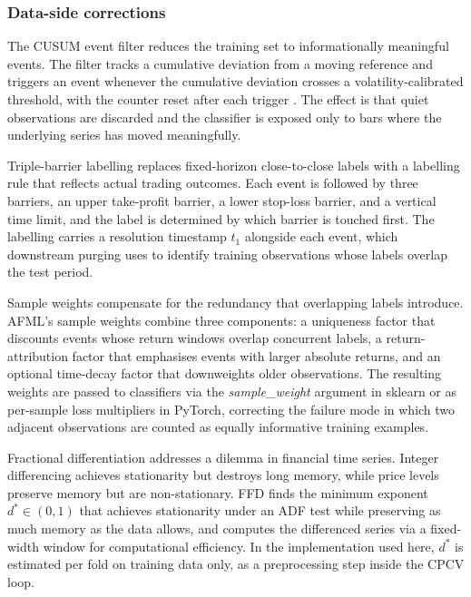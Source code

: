 \documentclass[12pt,a4paper,oneside]{article}
\begin{document}
\subsubsection{Data-side corrections}\label{subsubsec:afml_data_side}

The CUSUM event filter reduces the training set to informationally meaningful events. The filter tracks a cumulative deviation from a moving reference and triggers an event whenever the cumulative deviation crosses a volatility-calibrated threshold, with the counter reset after each trigger \citep[Snippet 2.4]{lopez_de_prado_2018}. The effect is that quiet observations are discarded and the classifier is exposed only to bars where the underlying series has moved meaningfully.

Triple-barrier labelling replaces fixed-horizon close-to-close labels with a labelling rule that reflects actual trading outcomes. Each event is followed by three barriers, an upper take-profit barrier, a lower stop-loss barrier, and a vertical time limit, and the label is determined by which barrier is touched first. The labelling carries a resolution timestamp $t_1$ alongside each event, which downstream purging uses to identify training observations whose labels overlap the test period.

Sample weights compensate for the redundancy that overlapping labels introduce. AFML's sample weights combine three components: a uniqueness factor that discounts events whose return windows overlap concurrent labels, a return-attribution factor that emphasises events with larger absolute returns, and an optional time-decay factor that downweights older observations. The resulting weights are passed to classifiers via the \textit{sample\_weight} argument in sklearn or as per-sample loss multipliers in PyTorch, correcting the failure mode in which two adjacent observations are counted as equally informative training examples.

Fractional differentiation addresses a dilemma in financial time series. Integer differencing achieves stationarity but destroys long memory, while price levels preserve memory but are non-stationary. FFD finds the minimum exponent $d^* \in (0, 1)$ that achieves stationarity under an ADF test while preserving as much memory as the data allows, and computes the differenced series via a fixed-width window for computational efficiency. In the implementation used here, $d^*$ is estimated per fold on training data only, as a preprocessing step inside the CPCV loop.
\end{document}
